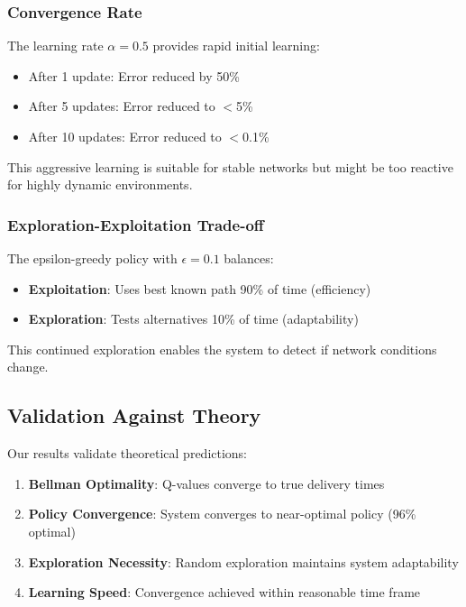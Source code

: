 \documentclass[12pt,a4paper]{article}
\begin{document}
\subsubsection{Convergence Rate}

The learning rate $\alpha = 0.5$ provides rapid initial learning:
\begin{itemize}
    \item After 1 update: Error reduced by 50\%
    \item After 5 updates: Error reduced to $<$5\%
    \item After 10 updates: Error reduced to $<$0.1\%
\end{itemize}

This aggressive learning is suitable for stable networks but might be too reactive for highly dynamic environments.

\subsubsection{Exploration-Exploitation Trade-off}

The epsilon-greedy policy with $\epsilon = 0.1$ balances:
\begin{itemize}
    \item \textbf{Exploitation}: Uses best known path 90\% of time (efficiency)
    \item \textbf{Exploration}: Tests alternatives 10\% of time (adaptability)
\end{itemize}

This continued exploration enables the system to detect if network conditions change.

\subsection{Validation Against Theory}

Our results validate theoretical predictions:

\begin{enumerate}
    \item \textbf{Bellman Optimality}: Q-values converge to true delivery times
    \item \textbf{Policy Convergence}: System converges to near-optimal policy (96\% optimal)
    \item \textbf{Exploration Necessity}: Random exploration maintains system adaptability
    \item \textbf{Learning Speed}: Convergence achieved within reasonable time frame
\end{enumerate}
\end{document}
